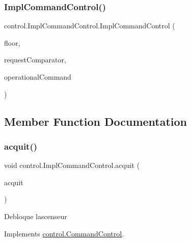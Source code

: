 \subsubsection{\texorpdfstring{ImplCommandControl()}{ImplCommandControl()}\hspace{0.1cm}{\footnotesize\ttfamily [3/3]}}
{\footnotesize\ttfamily control.\+Impl\+Command\+Control.\+Impl\+Command\+Control (\begin{DoxyParamCaption}\item[{int}]{floor,  }\item[{Comparator$<$ \mbox{\hyperlink{classcontrol_1_1command_1_1_floor_request}{Floor\+Request}} $>$}]{request\+Comparator,  }\item[{\mbox{\hyperlink{interfacecontrol_1_1_operational_command}{Operational\+Command}}}]{operational\+Command }\end{DoxyParamCaption})}



\subsection{Member Function Documentation}
\mbox{\label{classcontrol_1_1_impl_command_control_a18ba4e8d7e7b6ebfec099c22f58d55d1}} 
\subsubsection{\texorpdfstring{acquit()}{acquit()}}
{\footnotesize\ttfamily void control.\+Impl\+Command\+Control.\+acquit (\begin{DoxyParamCaption}\item[{\mbox{\hyperlink{classcontrol_1_1command_1_1_acquit}{Acquit}}}]{acquit }\end{DoxyParamCaption})}

Debloque l\textquotesingle{}ascenseur 

Implements \mbox{\hyperlink{interfacecontrol_1_1_command_control_a7eb9b7d638a4680fdf89453ca16a6c93}{control.\+Command\+Control}}.

\mbox{\label{classcontrol_1_1_impl_command_control_a992b195b4521cba044f235fa35f6a9b2}} 
